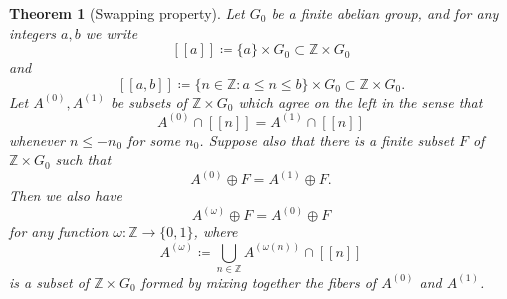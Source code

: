 \documentclass[reqno,a4paper,12pt]{amsart}
\numberwithin{equation}{section}
\numberwithin{figure}{section}
\def\Z{\mathbb{Z}}
\renewcommand\leq{\leqslant}
\theoremstyle{plain}
\newtheorem{theorem}[thm]{Theorem}
\theoremstyle{definition}
\begin{document}
\begin{theorem}[Swapping property]\label{Swap}  Let $G_0$ be a finite abelian group, and for any integers $a, b$ we write
$$[[a]] \coloneqq \{a\} \times G_0 \subset \Z \times G_0$$
and
$$[[a,b]] \coloneqq \{n \in \Z: a \leq n \leq b \} \times G_0 \subset \Z \times G_0.$$
Let $A^{(0)}, A^{(1)}$ be subsets of $\Z \times G_0$ which agree on the left in the sense that 
 $$A^{(0)} \cap [[n]] =  A^{(1)} \cap [[n]]$$
whenever $n \leq -n_0$ for some $n_0$.  Suppose also that there is a finite subset $F$ of $\Z \times G_0$ such that
\begin{equation}\label{a0-a1}
A^{(0)} \oplus F = A^{(1)} \oplus F.
\end{equation}
Then we also have
$$ A^{(\omega)} \oplus F = A^{(0)}
\oplus F$$
for any function $\omega \colon \Z \to \{0,1\}$, where 
\begin{equation}\label{a-omega}
A^{(\omega)} \coloneqq \bigcup_{n \in \Z} A^{(\omega(n))} \cap [[n]]
\end{equation}
is a subset of $\Z \times G_0$ formed by mixing together the fibers of $A^{(0)}$ and $ A^{(1)}$.
\end{theorem}
\end{document}
